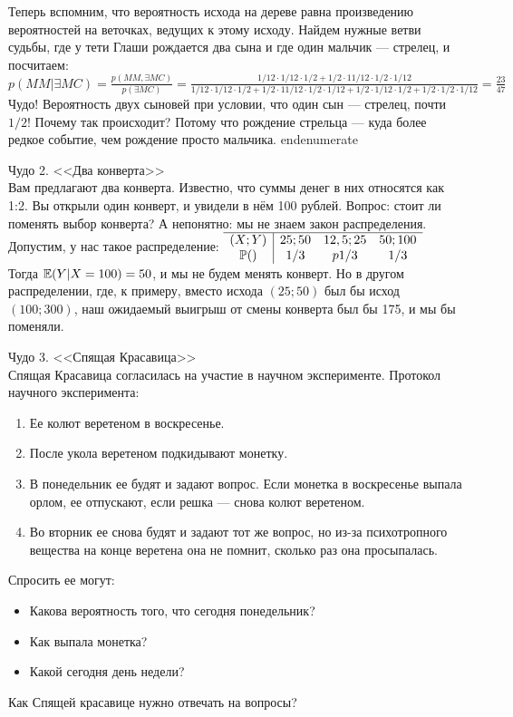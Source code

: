 Теперь вспомним, что вероятность исхода на дереве равна произведению вероятностей на веточках, ведущих к этому исходу. Найдем нужные ветви судьбы, где у тети Глаши рождается два сына и где один мальчик --- стрелец, и посчитаем:
$p(MM|\exists {MC})=\frac{p(MM,\exists{MC})}{p(\exists {MC})}=\frac{1/12\cdot1/12\cdot1/2+1/2\cdot11/12\cdot1/2\cdot1/12}{1/12\cdot1/12\cdot1/2+1/2\cdot11/12\cdot1/2\cdot1/12+1/2\cdot1/12\cdot1/2+1/2\cdot1/2\cdot1/12}=\frac{23}{47}$
Чудо! Вероятность двух сыновей при условии, что один сын --- стрелец, почти $1/2$!
Почему так происходит? Потому что рождение стрельца --- куда более редкое событие, чем рождение просто мальчика.
end{enumerate}

Чудо 2. <<Два конверта>>\\
Вам предлагают два конверта. Известно, что суммы денег в них относятся как 1:2. Вы открыли один конверт, и увидели в нём 100 рублей. Вопрос: стоит ли поменять выбор конверта?
А непонятно: мы не знаем закон распределения. 
Допустим, у нас такое распределение:
$\begin{array}{c|ccc}
\hline
(X;Y) & {25;50} & {12,5;25} & {50;100} \\
\P() & 1/3 & p {1/3} & {1/3} \\
\end{array}$ \\
Тогда $\E(Y|X=100)=50$, и мы не будем менять конверт. Но в другом распределении, где, к примеру, вместо исхода $(25;50)$ был бы исход $(100;300)$, наш ожидаемый выигрыш от смены конверта был бы 175, и мы бы поменяли. 

Чудо 3.  <<Спящая Красавица>>\\
Спящая Красавица согласилась на участие в научном эксперименте. 
Протокол научного эксперимента:
\begin{enumerate}
\item Ее колют веретеном в воскресенье.
\item После укола веретеном подкидывают монетку.
\item В понедельник ее будят и задают вопрос. Если монетка в воскресенье выпала орлом, ее отпускают, если решка --- снова колют веретеном.
\item Во вторник ее снова будят и задают тот же вопрос, но из-за психотропного вещества на конце веретена она не помнит, сколько раз она просыпалась. 
\end{enumerate}
Спросить ее могут:
\begin{itemize}
\item Какова вероятность того, что сегодня понедельник?
\item Как выпала монетка?
\item Какой сегодня день недели?
\end{itemize}
 Как Спящей красавице нужно отвечать на вопросы?

